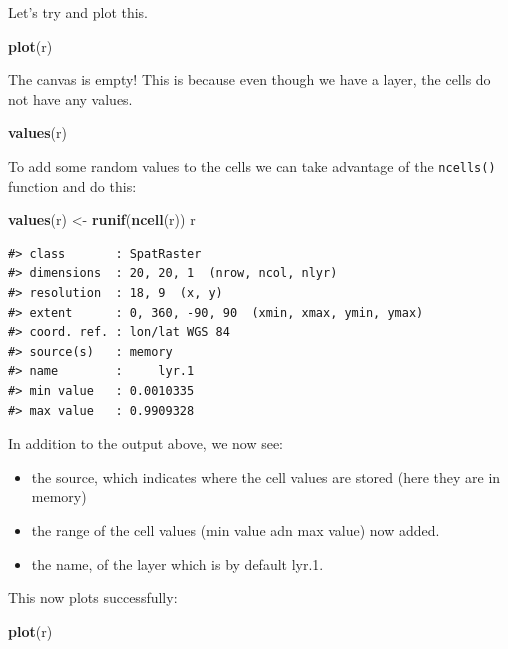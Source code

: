 \documentclass[
]{book}
\newenvironment{Shaded}{\begin{snugshade}}{\end{snugshade}}
\newcommand{\FunctionTok}[1]{\textcolor[rgb]{0.13,0.29,0.53}{\textbf{#1}}}
\newcommand{\NormalTok}[1]{#1}
\newcommand{\OtherTok}[1]{\textcolor[rgb]{0.56,0.35,0.01}{#1}}
\providecommand{\tightlist}{%
  \setlength{\itemsep}{0pt}\setlength{\parskip}{0pt}}
\begin{document}
Let's try and plot this.

\begin{Shaded}
\begin{Highlighting}[]
\FunctionTok{plot}\NormalTok{(r)}
\end{Highlighting}
\end{Shaded}

The canvas is empty! This is because even though we have a layer, the cells do not have any values.

\begin{Shaded}
\begin{Highlighting}[]
\FunctionTok{values}\NormalTok{(r)}
\end{Highlighting}
\end{Shaded}

To add some random values to the cells we can take advantage of the \texttt{ncells()} function and do this:

\begin{Shaded}
\begin{Highlighting}[]
\FunctionTok{values}\NormalTok{(r) }\OtherTok{\textless{}{-}} \FunctionTok{runif}\NormalTok{(}\FunctionTok{ncell}\NormalTok{(r))}
\NormalTok{r }
\end{Highlighting}
\end{Shaded}

\begin{verbatim}
#> class       : SpatRaster 
#> dimensions  : 20, 20, 1  (nrow, ncol, nlyr)
#> resolution  : 18, 9  (x, y)
#> extent      : 0, 360, -90, 90  (xmin, xmax, ymin, ymax)
#> coord. ref. : lon/lat WGS 84 
#> source(s)   : memory
#> name        :     lyr.1 
#> min value   : 0.0010335 
#> max value   : 0.9909328
\end{verbatim}

In addition to the output above, we now see:

\begin{itemize}
\tightlist
\item
  the source, which indicates where the cell values are stored (here they are in memory)
\item
  the range of the cell values (min value adn max value) now added.
\item
  the name, of the layer which is by default lyr.1.
\end{itemize}

This now plots successfully:

\begin{Shaded}
\begin{Highlighting}[]
\FunctionTok{plot}\NormalTok{(r)}
\end{Highlighting}
\end{Shaded}
\end{document}
